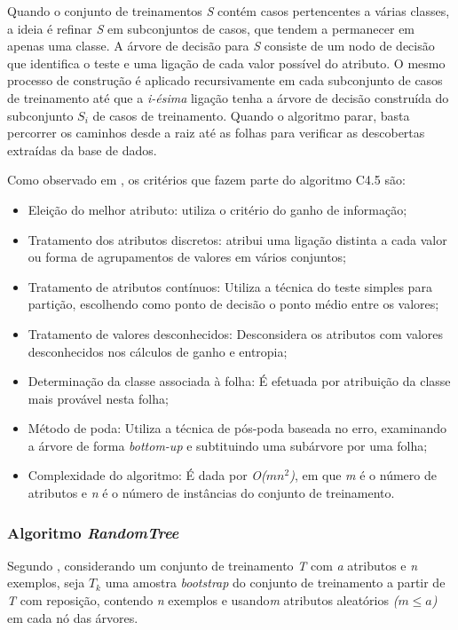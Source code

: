 \documentclass[
	12pt,				%
	openright,			%
	oneside,	
	a4paper,				%
	english,				%
	brazil				%
]{abntex2/abntex2} %
\begin{document}
	Quando o conjunto de treinamentos \textit{S} contém casos pertencentes a várias classes, a ideia é refinar \textit{S} em subconjuntos de casos, que tendem a permanecer em apenas uma classe. A árvore de decisão para \textit{S} consiste de um nodo de decisão que identifica o teste e uma ligação de cada valor possível do atributo. O mesmo processo de construção é aplicado recursivamente em cada subconjunto de casos de treinamento até que a \textit{i-ésima} ligação tenha a árvore de decisão construída do subconjunto \textit{$S_i$} de casos de treinamento. Quando o algoritmo parar, basta percorrer os caminhos desde a raiz até as folhas para verificar as descobertas extraídas da base de dados.
	
	Como observado em \cite{halmenschlager:2002}, os critérios que fazem parte do algoritmo C4.5 são:
	
	\begin{itemize}
		\item Eleição do melhor atributo: utiliza o critério do ganho de informação;
		\item Tratamento dos atributos discretos: atribui uma ligação distinta a cada valor ou forma de agrupamentos de valores em vários conjuntos;
		\item Tratamento de atributos contínuos: Utiliza a técnica do teste simples para partição, escolhendo como ponto de decisão o ponto médio entre os valores;
		\item Tratamento de valores desconhecidos: Desconsidera os atributos com valores desconhecidos nos cálculos de ganho e entropia;
		\item Determinação da classe associada à folha: É efetuada por atribuição da classe mais provável nesta folha;
		\item Método de poda: Utiliza a técnica de pós-poda baseada no erro, examinando a árvore de forma \textit{bottom-up} e subtituindo uma subárvore por uma folha;
		\item Complexidade do algoritmo: É dada por \textit{O($mn^{2}$)}, em que \textit{m} é o número de atributos e \textit{n} é o número de instâncias do conjunto de treinamento. 
	\end{itemize}

	\subsubsection{Algoritmo \textit{RandomTree}}
	
	Segundo \cite{oshiro:2013}, considerando um conjunto de treinamento \textit{T} com \textit{a} atributos e \textit{n} exemplos, seja \textit{$T_k$} uma amostra \textit{bootstrap} do conjunto de treinamento a partir de \textit{T} com reposição, contendo \textit{n} exemplos e usando\textit{m} atributos aleatórios \textit{($m\le a$)} em cada nó das árvores.
	
\end{document}
